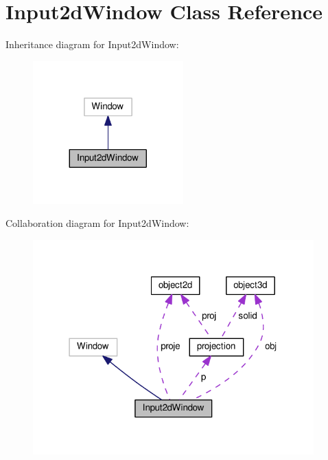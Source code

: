 \hypertarget{classInput2dWindow}{}\section{Input2d\+Window Class Reference}
\label{classInput2dWindow}


Inheritance diagram for Input2d\+Window\+:
\nopagebreak
\begin{figure}[H]
\begin{center}
\leavevmode
\includegraphics[width=164pt]{classInput2dWindow__inherit__graph}
\end{center}
\end{figure}


Collaboration diagram for Input2d\+Window\+:
\nopagebreak
\begin{figure}[H]
\begin{center}
\leavevmode
\includegraphics[width=307pt]{classInput2dWindow__coll__graph}
\end{center}
\end{figure}
